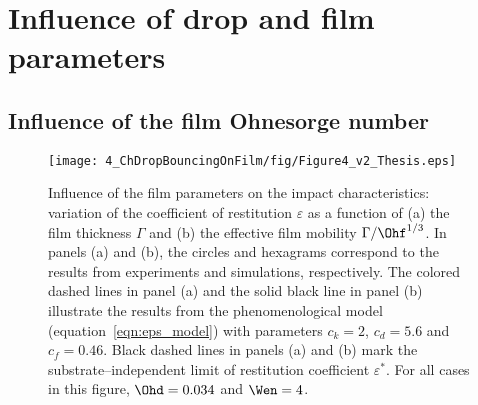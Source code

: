 \section{Influence of drop and film parameters}\label{sec:influence}

\subsection{Influence of the film Ohnesorge number}
\begin{figure}
	\centering
	\texttt{[image: 4\_ChDropBouncingOnFilm/fig/Figure4\_v2\_Thesis.eps]}
	\caption{Influence of the film parameters on the impact characteristics: variation of the coefficient of restitution $\varepsilon$ as a function of (a) the film thickness $\Gamma$ and (b) the effective film mobility $\Gamma / \Ohf^{1/3}$. In panels (a) and (b), the circles and hexagrams correspond to the results from experiments and simulations, respectively. The colored dashed lines in panel (a) and the solid black line in panel (b) illustrate the results from the phenomenological model (equation~\eqref{eqn:eps_model}) with parameters $c_{k} = 2$, $c_{d} = 5.6$ and $c_{f} = 0.46$. Black dashed lines in panels (a) and (b) mark the substrate--independent limit of restitution coefficient $\varepsilon^*$. For all cases in this figure, $\Ohd = 0.034$ and $\Wen = 4$.}
	\label{fig:controlParameters1}
\end{figure}

